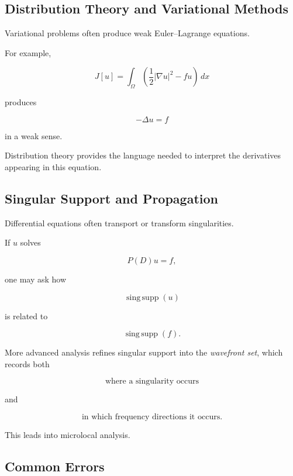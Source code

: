 \subsection{Distribution Theory and Variational Methods}
\label{subsec:distribution-variational-methods}

Variational problems often produce weak Euler--Lagrange equations.

For example,

\[
J[u]
=
\int_\Omega
\left(
\frac12|\nabla u|^2-fu
\right)\,dx
\]

produces

\[
\boxed{
-\Delta u=f
}
\]

in a weak sense.

Distribution theory provides the language needed to interpret the
derivatives appearing in this equation.

\subsection{Singular Support and Propagation}
\label{subsec:singular-support-propagation}

Differential equations often transport or transform singularities.

If \(u\) solves

\[
P(D)u=f,
\]

one may ask how

\[
\operatorname{sing\,supp}(u)
\]

is related to

\[
\operatorname{sing\,supp}(f).
\]

More advanced analysis refines singular support into the
\emph{wavefront set}, which records both

\[
\boxed{
\text{where a singularity occurs}
}
\]

and

\[
\boxed{
\text{in which frequency directions it occurs}.
}
\]

This leads into microlocal analysis.

\subsection{Common Errors}
\label{subsec:distribution-theory-common-errors}

